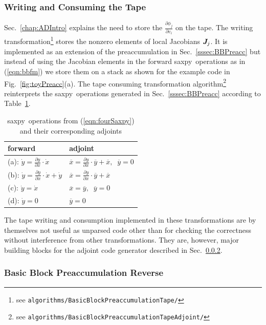 \documentclass{book}
\newcommand{\saxpy}{saxpy}
\newcommand{\bmJ}{\mbox{\bf\em J}}
\newcommand{\refsec}[1]{{Sec.~\ref{#1}}}
\newcommand{\reffig}[1]{{Fig.~\ref{#1}}}
\newcommand{\reftab}[1]{{Table~\ref{#1}}}
\newcommand{\refeqn}[1]{{(\ref{#1})}}
\begin{document}
\subsubsection{Writing and Consuming the Tape}\label{sssec:bbTA}

\refsec{chap:ADIntro} explains the need to store the $\frac{\partial \phi_j}{\partial v_i}$ 
on the tape. 
The writing transformation\footnote{
  see {\tt algorithms/BasicBlockPreaccumulationTape/}
}
stores the nonzero elements of local
Jacobians $\bmJ_j$. It is implemented as an extension of the 
preaccumulation in \refsec{sssec:BBPreacc} but instead of using the Jacobian elements 
in the forward 
\saxpy\ operations as in \refeqn{eqn:bbfm} we store them 
on a stack as shown for the example code in \reffig{fig:toyPreacc}(a). 
The tape consuming transformation algorithm\footnote{ 
  see {\tt algorithms/BasicBlockPreaccumulationTapeAdjoint/}
} 
reinterprets
the \saxpy\ operations generated in \refsec{sssec:BBPreacc} 
according to \reftab{tab:saxpyAdj}.
\begin{table}
  \begin{center}
    \begin{tabular}{l|l}
      forward & adjoint\\\hline
      (a): $\dot{y} = \frac{\partial y }{\partial x }\cdot \dot{x}$           & $\overline{x} = \frac{\partial y }{\partial x }\cdot \overline{y} + \overline{x},\;\;\overline{y}=0$ \\
      (b): $\dot{y} = \frac{\partial y }{\partial x }\cdot \dot{x} + \dot{y}$ & $\overline{x} = \frac{\partial y }{\partial x }\cdot \overline{y} + \overline{x}$ \\
      (c): $\dot{y} = \dot{x}$ 					            & $\overline{x} = \overline{y},\;\;\overline{y}=0$\\
      (d): $\dot{y} = 0$ 						            & $\overline{y} = 0$ 
    \end{tabular}
  \end{center}
  \caption{\saxpy\ operations  from \refeqn{eqn:fourSaxpy} and their corresponding adjoints} \label{tab:saxpyAdj}
\end{table} 
The tape writing and consumption implemented in these transformations are 
by themselves not useful as unparsed code other than for checking the correctness without 
interference from other transformations. 
They are, however, major building blocks for the  
adjoint code generator described in \refsec{sssec:BBRev}.
\subsubsection{Basic Block Preaccumulation Reverse}\label{sssec:BBRev}
\end{document}
